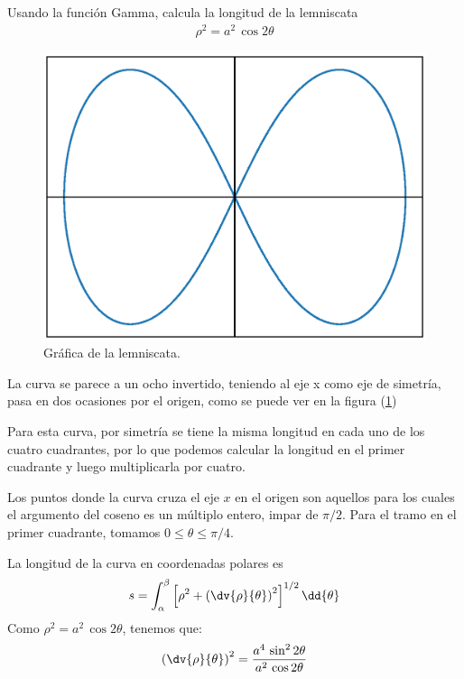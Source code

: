 Usando la función Gamma, calcula la longitud de la lemniscata
\begin{align*}
\rho^{2} = a^{2} \, \cos 2 \theta
\end{align*}
\begin{figure}
    \centering
    \includegraphics[scale=0.54]{Imagenes/plot_leminscata_01.eps}
    \caption{Gráfica de la lemniscata.}
    \label{fig:figura_lemniscata}
\end{figure}
La curva se parece a un ocho invertido, teniendo al eje x como eje de simetría, pasa en dos ocasiones por el origen, como se puede ver en la figura (\ref{fig:figura_lemniscata})
\par
Para esta curva, por simetría se tiene la misma longitud en cada uno de los cuatro cuadrantes, por lo que podemos calcular la longitud en el primer cuadrante y luego multiplicarla por cuatro.
\par
Los puntos donde la curva cruza el eje $x$ en el origen son aquellos para los cuales el argumento del coseno es un múltiplo entero, impar de $\pi / 2$.  Para el tramo en el primer cuadrante, tomamos $0 \leq \theta \leq \pi/4$.
\par
La longitud de la curva en coordenadas polares es
\begin{align*}
s = \int_{\alpha}^{\beta} \left[ \rho^{2} + \left( \dv{\rho}{\theta} \right)^{2} \right]^{1/2} \dd{\theta}
\end{align*}
Como $\rho^{2} = a^{2} \, \cos 2 \theta$, tenemos que:
\begin{align*}
\left( \dv{\rho}{\theta} \right)^{2} = \dfrac{a^{4} \, \sin^{2} 2 \theta}{a^{2} \, \cos 2 \theta}
\end{align*}
